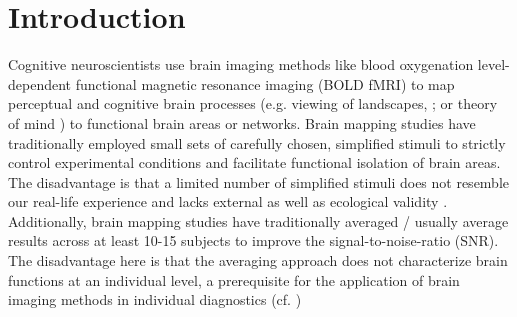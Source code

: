 \documentclass[english]{article}
\begin{document}
\section{Introduction}
Cognitive neuroscientists use brain imaging methods like blood oxygenation level-dependent functional magnetic resonance imaging (BOLD fMRI) to map perceptual and cognitive brain processes (e.g. viewing of landscapes, \citep{epstein1998ppa}; or theory of mind \citep{spunt2014validating}) to functional brain areas or networks. Brain mapping studies have traditionally employed small sets of carefully chosen, simplified stimuli to strictly control experimental conditions and facilitate functional isolation of brain areas.
The disadvantage is that a limited number of simplified stimuli does not resemble our real-life experience and lacks external \citep{westfall2016fixing} as well as ecological validity \citep{hasson2004intersubject}.
Additionally, brain mapping studies have traditionally averaged / usually average results across at least 10-15 subjects to improve the signal-to-noise-ratio (SNR). The disadvantage here is that the averaging approach does not  characterize brain functions at an individual level, a prerequisite for the application of brain imaging methods in individual diagnostics (cf. \citep{dubois2016building})
\end{document}
